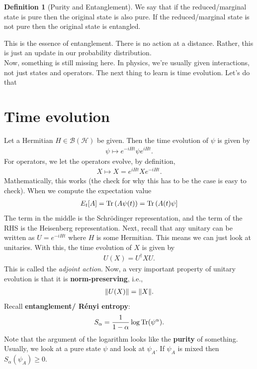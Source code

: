 \documentclass{book}
\theoremstyle{definition}
\newtheorem{defn}{Definition}[section]
\newcommand{\had}{\mathcal{H}}
\newcommand{\al}{\alpha}
\newcommand{\f}[2]{\frac{#1}{#2}}
\newcommand{\lp}{\left(}
\newcommand{\rp}{\right)}
\newcommand{\rb}{\right]}
\begin{document}
\begin{defn}[Purity and Entanglement]
	We say that if the reduced/marginal state is pure then the original state is also pure. If the reduced/marginal state is not pure then the original state is entangled. 
\end{defn}

This is the essence of entanglement. There is no action at a distance. Rather, this is just an update in our probability distribution. \\




Now, something is still missing here. In physics, we're usually given interactions, not just states and operators. The next thing to learn is time evolution. Let's do that



\newpage

\section{Time evolution}

Let a Hermitian $H \in \mathcal{B}(\had)$ be given. Then the time evolution of $\psi$ is given by
\begin{align}
\psi \mapsto e^{-iH t}\psi e^{iH t}.
\end{align}
For operators, we let the operators evolve, by definition,
\begin{align}
X \mapsto X = e^{iHt}X e^{-iHt}.
\end{align}
Mathematically, this works (the check for why this has to be the case is easy to check). When we compute the expectation value 
\begin{align}
E_t[A] = \Tr\lp A\psi(t) \rp = \Tr\lp A(t)\psi \rb
\end{align}
The term in the middle is the Schrödinger representation, and the term of the RHS is the Heisenberg representation. Next, recall that any unitary can be written as $U = e^{-iHt}$ where $H$ is some Hermitian. This means we can just look at unitaries. With this, the time evolution of $X$ is given by
\begin{align}
U(X) = U^\dagger X U.
\end{align}
This is called the \textit{adjoint action}. Now, a very important property of unitary evolution is that it is \textbf{norm-preserving}, i.e.,
\begin{align}
\norm{U(X)} = \norm{X}.
\end{align}
Recall \textbf{entanglement/ R\'enyi entropy}:
\begin{align}
S_\al = \f{1}{1-\al}\log \Tr(\psi^\al).
\end{align}
Note that the argument of the logarithm looks like the \textbf{purity} of something. Usually, we look at a pure state $\psi$ and look at $\psi_A$. If $\psi_A$ is mixed then $S_\al(\psi_A) \geq 0$. \\
\end{document}

